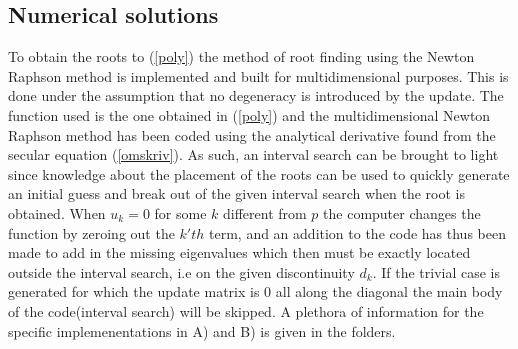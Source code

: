 \documentclass{article}
\begin{document}
\subsection*{Numerical solutions}
To obtain the roots to (\ref{poly}) the method of root finding using the Newton Raphson method is implemented and built for multidimensional purposes. This is done under the assumption that no degeneracy is introduced by the update. The function used is the one obtained in (\ref{poly}) and the multidimensional Newton Raphson method has been coded using the analytical derivative found from the secular equation (\ref{omskriv}).
As such, an interval search can be brought to light since knowledge about the placement of the roots can be used to quickly generate an initial guess and break out of the given interval search when the root is obtained.
When $u_{k}=0$ for some $k$ different from $p$ the computer changes the function by zeroing out the $k'th$ term, and an addition to the code has thus been made to add in the missing eigenvalues which then must be exactly located outside the interval search, i.e on the given discontinuity $d_{k}$. If the trivial case is generated for which the update matrix is 0 all along the diagonal the main body of the code(interval search) will be skipped. A plethora of information for the specific implemenentations in A) and B) is given in the folders.
\newpage
\end{document}
